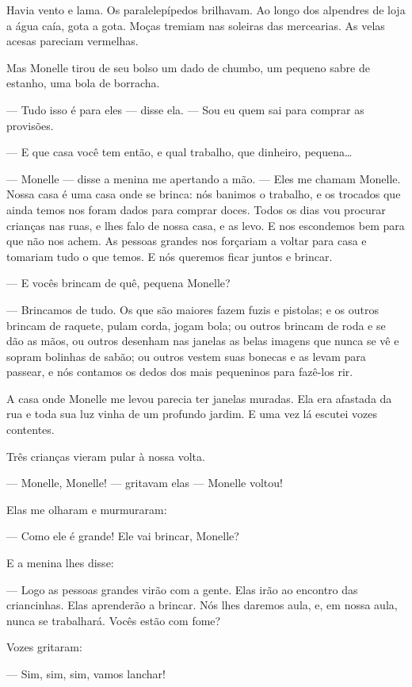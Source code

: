 Havia vento e lama. Os paralelepípedos brilhavam. Ao longo dos
alpendres de loja a água caía, gota a gota. Moças tremiam nas soleiras das
mercearias. As velas acesas pareciam vermelhas.

Mas Monelle tirou de seu bolso um dado de chumbo, um pequeno sabre de
estanho, uma bola de borracha.

--- Tudo isso é para eles --- disse ela. --- Sou eu quem sai para comprar as
provisões.

--- E que casa você tem então, e qual trabalho, que dinheiro, pequena\ldots{}

--- Monelle --- disse a menina me apertando a mão. --- Eles me chamam Monelle.
Nossa casa é uma casa onde se brinca: nós banimos o trabalho, e os
trocados que ainda temos nos foram dados para comprar doces. Todos os dias
vou procurar crianças nas ruas, e lhes falo de nossa casa, e as levo. E
nos escondemos bem para que não nos achem. As pessoas grandes nos
forçariam a voltar para casa e tomariam tudo o que temos. E nós queremos
ficar juntos e brincar.

--- E vocês brincam de quê, pequena Monelle?

--- Brincamos de tudo. Os que são maiores fazem fuzis e pistolas; e os
outros brincam de raquete, pulam corda, jogam bola; ou outros brincam de
roda e se dão as mãos, ou outros desenham nas janelas as belas imagens que
nunca se vê e sopram bolinhas de sabão; ou outros vestem suas bonecas e as
levam para passear, e nós contamos os dedos dos mais pequeninos para
fazê-los rir.

A casa onde Monelle me levou parecia ter janelas muradas. Ela era
afastada da rua e toda sua luz vinha de um profundo jardim. E uma vez lá escutei
vozes contentes.

Três crianças vieram pular à nossa volta.

--- Monelle, Monelle! --- gritavam elas --- Monelle voltou!

Elas me olharam e murmuraram:

--- Como ele é grande! Ele vai brincar, Monelle?

E a menina lhes disse:

--- Logo as pessoas grandes virão com a gente. Elas irão ao encontro das
criancinhas. Elas aprenderão a brincar. Nós lhes daremos aula, e, em nossa
aula, nunca se trabalhará. Vocês estão com fome?

Vozes gritaram:

--- Sim, sim, sim, vamos lanchar!

